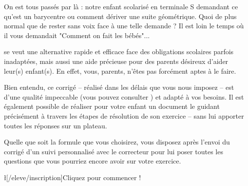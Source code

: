 On est tous passés par là : notre enfant scolarisé en terminale S demandant ce qu'est un barycentre ou comment dériver une suite géométrique. Quoi de plus normal que de rester sans voix face à une telle demande ? Il est loin le temps où il vous demandait "Comment on fait les bébés"...

\eDevoir se veut une alternative rapide et efficace face des obligations scolaires parfois inadaptées, mais aussi une aide précieuse pour des parents désireux d'aider leur(s) enfant(s). En effet, vous, parents, n'êtes pas forcément aptes à le faire.

Bien entendu, ce corrigé -- réalisé dans les délais que vous nous imposez -- est d'une qualité impeccable (vous pouvez consulter ) et adapté à vos besoins. Il est également possible de réaliser pour votre enfant un document le guidant précisément à travers les étapes de résolution de son exercice -- sans lui apporter toutes les réponses sur un plateau.

Quelle que soit la formule que vous choisirez, vous disposez après l'envoi du corrigé d'un suivi personnalisé avec le correcteur pour lui poser toutes les questions que vous pourriez encore avoir sur votre exercice.

\l[/eleve/inscription]{Cliquez pour commencer !}